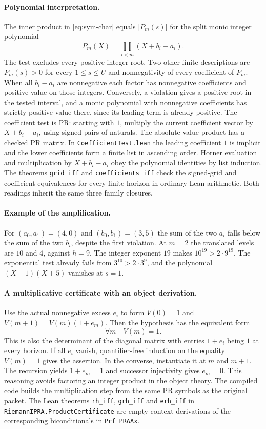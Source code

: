 \paragraph{Polynomial interpretation.}
The inner product in \eqref{eq:sym-char} equals $|P_m(s)|$ for the split monic integer polynomial
\[
 P_m(X)=\prod_{i<m}(X+b_i-a_i).
\]
The test excludes every positive integer root. Two other finite descriptions are $P_m(s)>0$ for every $1\le s\le U$ and nonnegativity of every coefficient of $P_m$. When all $b_i-a_i$ are nonnegative each factor has nonnegative coefficients and positive value on those integers. Conversely, a violation gives a positive root in the tested interval, and a monic polynomial with nonnegative coefficients has strictly positive value there, since its leading term is already positive. The coefficient test is PR: starting with $1$, multiply the current coefficient vector by $X+b_i-a_i$, using signed pairs of naturals. The absolute-value product has a checked PR matrix. In \texttt{CoefficientTest.lean} the leading coefficient $1$ is implicit and the lower coefficients form a finite list in ascending order. Horner evaluation and multiplication by $X+b_i-a_i$ obey the polynomial identities by list induction. The theorems \texttt{grid\_iff} and \texttt{coefficients\_iff} check the signed-grid and coefficient equivalences for every finite horizon in ordinary Lean arithmetic. Both readings inherit the same three family closures.

\paragraph{Example of the amplification.}
For $(a_0,a_1)=(4,0)$ and $(b_0,b_1)=(3,5)$ the sum of the two $a_i$ falls below the sum of the two $b_i$, despite the first violation. At $m=2$ the translated levels are $10$ and $4$, against $h=9$. The integer exponent $19$ makes $10^{19}>2\cdot9^{19}$. The exponential test already fails from $3^{10}>2\cdot3^9$, and the polynomial $(X-1)(X+5)$ vanishes at $s=1$.

\paragraph{A multiplicative certificate with an object derivation.}
Use the actual nonnegative excess $e_i$ to form $V(0)=1$ and
$V(m+1)=V(m)(1+e_m)$. Then the hypothesis has the equivalent form
\[
                    \forall m\quad V(m)=1.
\]
This is also the determinant of the diagonal matrix with entries $1+e_i$ being $1$ at every horizon. If all $e_i$ vanish, quantifier-free induction on the equality $V(m)=1$ gives the assertion. In the converse, instantiate it at $m$ and $m+1$. The recursion yields $1+e_m=1$ and successor injectivity gives $e_m=0$. This reasoning avoids factoring an integer product in the object theory. The compiled code builds the multiplication step from the same PR symbols as the original packet. The Lean theorems \texttt{rh\_iff}, \texttt{grh\_iff} and \texttt{erh\_iff} in \texttt{RiemannIPRA.ProductCertificate} are empty-context derivations of the corresponding biconditionals in \texttt{Prf PRAAx}.

